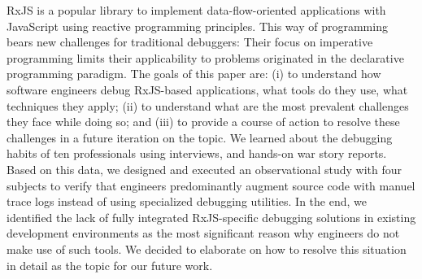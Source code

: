 RxJS is a popular library to implement data-flow-oriented applications with JavaScript using reactive programming principles. This way of programming bears new challenges for traditional debuggers: Their focus on imperative programming limits their applicability to problems originated in the declarative programming paradigm. The goals of this paper are: (i) to understand how software engineers debug RxJS-based applications, what tools do they use, what techniques they apply; (ii) to understand what are the most prevalent challenges they face while doing so; and (iii) to provide a course of action to resolve these challenges in a future iteration on the topic. We learned about the debugging habits of ten professionals using interviews, and hands-on war story reports. Based on this data, we designed and executed an observational study with four subjects to verify that engineers predominantly augment source code with manuel trace logs instead of using specialized debugging utilities. In the end, we identified the lack of fully integrated RxJS-specific debugging solutions in existing development environments as the most significant reason why engineers do not make use of such tools. We decided to elaborate on how to resolve this situation in detail as the topic for our future work.